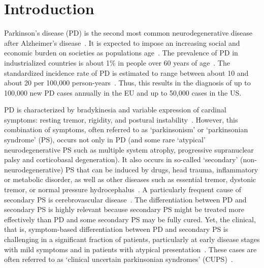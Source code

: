 \section{Introduction}
\label{sec:intro}


Parkinson's disease (PD) is the second most common neurodegenerative disease after Alzheimer's disease~\citep{Twelves2003}. 
It is expected to impose an increasing social and economic burden on societies as populations age~\citep{DeLau2006}. 
The prevalence of PD in industrialized countries is about 1\% in people over 60 years of age~\citep{DeLau2006}. 
The standardized incidence rate of PD is estimated to range between about 10 and about 20 per 100,000 person-years~\citep{DeLau2006}. 
Thus, this results in the diagnosis of up to 100,000 new PD cases annually in the EU and up to 50,000 cases in the US.


PD is characterized by bradykinesia and variable expression of cardinal symptoms: resting tremor, rigidity, and postural instability~\citep{Tolosa2006, Gibb1988}.
However, this combination of symptoms, often referred to as `parkinsonism' or `parkinsonian syndrome' (PS), 
occurs not only in PD (and some rare `atypical' neurodegenerative PS such as multiple system atrophy, progressive 
supranuclear palsy and corticobasal degeneration). 
It also occurs in so-called `secondary' (non-neurodegenerative) PS that can be induced by drugs, head trauma, 
inflammatory or metabolic disorder, as well as other diseases such as essential tremor, dystonic tremor, or normal pressure hydrocephalus~\citep{Tolosa2006, Piccini2004}.
A particularly frequent cause of secondary PS is cerebrovascular disease~\citep{Funke2013}.
The differentiation between PD and secondary PS is highly relevant 
because secondary PS might be treated more effectively than PD and some secondary PS may be fully cured.
Yet, the clinical, that is, symptom-based differentiation between PD and secondary PS is challenging in a significant fraction of patients, 
particularly at early disease stages with mild symptoms and in patients with atypical presentation~\citep{Hughes2002, Hughes1992}.
These cases are often referred to as `clinical uncertain parkinsonian syndromes' (CUPS)~\citep{Catafau2004}.


